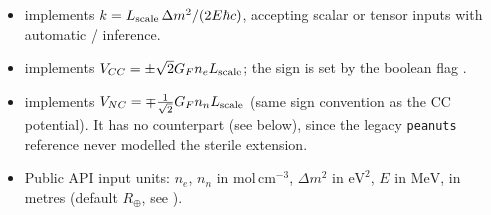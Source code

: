 \begin{implbox}
\begin{itemize}
  \item {}
    implements $k = L_{\rm scale}\,\Delta m^2/(2E\hbar c)$, accepting scalar
    or tensor inputs with automatic / inference.
  \item {}
    implements $V_{CC}=\pm\sqrt2 G_F n_e L_{\rm scale}$; the sign is set by
    the boolean flag .
  \item {}
    implements $V_{NC}=\mp\tfrac{1}{\sqrt2} G_F n_n L_{\rm scale}$ (same
     sign convention as the CC potential). It has no
     counterpart (see below), since the legacy
    \texttt{peanuts} reference never modelled the sterile extension.
  \item Public API input units: $n_e$, $n_n$ in $\mathrm{mol\,cm^{-3}}$,
    $\Delta m^2$ in $\mathrm{eV^2}$, $E$ in $\mathrm{MeV}$,
     in metres (default $R_\oplus$, see
    ).
\end{itemize}
\end{implbox}

